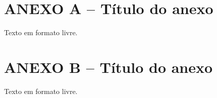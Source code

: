 


\chapter*{ANEXO A -- Título do anexo}\label{apendiceA}


Texto em formato livre.




\chapter*{ANEXO B -- Título do anexo}\label{apendiceB}



Texto em formato livre.